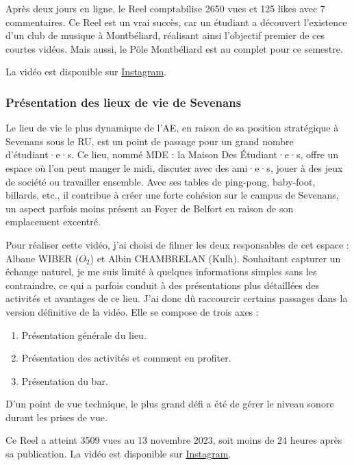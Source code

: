 Après deux jours en ligne, le Reel comptabilise 2650 vues et 125 likes avec 7 commentaires.
Ce Reel est un vrai succès, car un étudiant a découvert l'existence d'un club de musique à Montbéliard, réalisant ainsi l'objectif premier de ces courtes vidéos.
 Mais aussi, le Pôle Montbéliard est au complet pour ce semestre.

La vidéo est disponible sur \href{https://www.instagram.com/reel/CyEDJKTspWL/?utm_source=ig_web_copy_link&igshid=MzRlODBiNWFlZA==}{Instagram}.


\subsubsection{Présentation des lieux de vie de Sevenans}\label{subsubsec:MDE}

Le lieu de vie le plus dynamique de l'\gls{AE}, en raison de sa position stratégique à Sevenans sous le RU, est un point de passage pour un grand nombre d'étudiant·e·s.
Ce lieu, nommé MDE : la Maison Des Étudiant·e·s, offre un espace où l'on peut manger le midi, discuter avec des ami·e·s, jouer à des jeux de société ou travailler ensemble.
Avec ses tables de ping-pong, baby-foot, billards, etc., il contribue à créer une forte cohésion sur le campus de Sevenans, un aspect parfois moins présent au Foyer de Belfort en raison de son emplacement excentré.

Pour réaliser cette vidéo, j'ai choisi de filmer les deux responsables de cet espace : Albane WIBER ($O_2$) et Albin CHAMBRELAN (Kulh).
Souhaitant capturer un échange naturel, je me suis limité à quelques informations simples sans les contraindre, ce qui a parfois conduit à des présentations plus détaillées des activités et avantages de ce lieu.
J'ai donc dû raccourcir certains passages dans la version définitive de la vidéo.
Elle se compose de trois axes :
\begin{enumerate}
    \item Présentation générale du lieu.
    \item Présentation des activités et comment en profiter.
    \item Présentation du bar.
\end{enumerate}

D'un point de vue technique, le plus grand défi a été de gérer le niveau sonore durant les prises de vue.

Ce Reel a atteint 3509 vues au 13 novembre 2023, soit moins de 24 heures après sa publication.
La vidéo est disponible sur \href{https://www.instagram.com/reel/CzjfX8Xs5X1/?utm_source=ig_web_copy_link&igshid=MzRlODBiNWFlZA==}{Instagram}.

